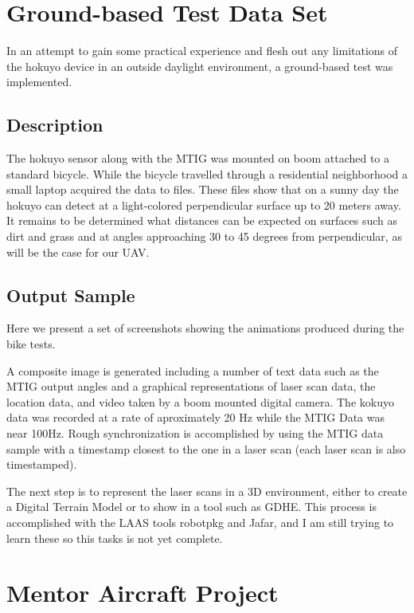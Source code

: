 \documentclass[a4paper,11pt]{report}
\begin{document}
\section{Ground-based Test Data Set}

In an attempt to gain some practical experience and flesh out any limitations of the hokuyo device in an outside daylight environment, a ground-based test was implemented. 

\subsection{Description}

The hokuyo sensor along with the MTIG was mounted on boom attached to a standard bicycle. While the bicycle travelled through a residential neighborhood a small laptop acquired the data to files. These files show that on a sunny day the hokuyo can detect at a light-colored perpendicular surface up to 20 meters away. It remains to be determined what distances can be expected on surfaces such as dirt and grass and at angles approaching 30 to 45 degrees from perpendicular, as will be the case for our UAV.

\subsection{Output Sample}

Here we present a set of screenshots showing the animations produced during the bike tests.

A composite image is generated including a number of text data such as the MTIG output angles and a graphical representations of laser scan data, the location data, and video taken by a boom mounted digital camera. The kokuyo data was recorded at a rate of aproximately 20 Hz while the MTIG Data was near 100Hz. Rough synchronization is accomplished by using the MTIG data sample with a timestamp closest to the one in a laser scan (each laser scan is also timestamped).

The next step is to represent the laser scans in a 3D environment, either to create a Digital Terrain Model or to show in a tool such as GDHE. This process is accomplished with the LAAS tools robotpkg and Jafar, and I am still trying to learn these so this tasks is not yet complete.

\section{Mentor Aircraft Project}
\end{document}
